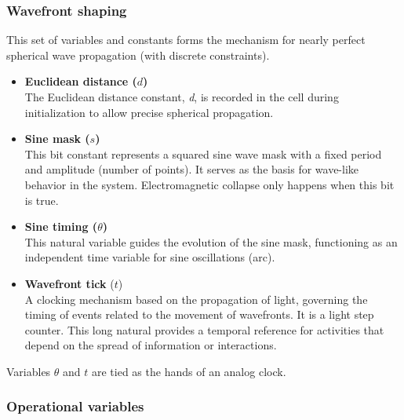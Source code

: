 \documentclass[12pt,english]{article}
\begin{document}
\subsubsection{Wavefront shaping}
This set of variables and constants forms the mechanism for nearly perfect spherical wave propagation (with discrete constraints).
\begin{itemize}
    \item \textbf{Euclidean distance ($d$)} \\
    The Euclidean distance constant, \emph{d}, is recorded in the cell during initialization to allow precise spherical propagation.
    
    \item \textbf{Sine mask ($s$)} \\
    This bit constant represents a squared sine wave mask with a fixed period and amplitude (number of points). It serves as the basis for wave-like behavior in the system. Electromagnetic collapse only happens when this bit is true.
    
    \item \textbf{Sine timing ($\theta$)} \\
    This natural variable guides the evolution of the sine mask, functioning as an independent time variable for sine oscillations (arc).

    \item \textbf{Wavefront tick} ($t$)\\
     A clocking mechanism based on the propagation of light, governing the timing of events related to the movement of wavefronts. It is a light step counter. This long natural provides a temporal reference for activities that depend on the spread of information or interactions.
 
\end{itemize}

Variables $\theta$ and $t$ are tied as the hands of an analog clock.
 
\subsubsection{Operational variables}
\end{document}
